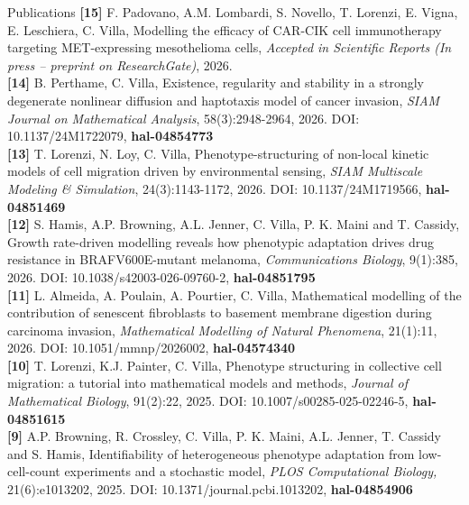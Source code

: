 \documentclass{resume} %
\begin{document}
\newpage
%
\begin{rSection}{Publications}
{\bf [15]} F. Padovano, A.M. Lombardi, S. Novello, T. Lorenzi, E. Vigna, E. Leschiera, C. Villa, Modelling the efficacy of CAR-CIK cell immunotherapy targeting MET-expressing mesothelioma cells, \textit{Accepted in Scientific Reports (In press -- preprint on ResearchGate)}, 2026.\\
{\bf [14]} B. Perthame, C. Villa,  Existence, regularity and stability in a strongly degenerate nonlinear diffusion and haptotaxis model of cancer invasion, \textit{SIAM Journal on Mathematical Analysis}, 58(3):2948-2964, 2026. DOI: 10.1137/24M1722079, 
\textbf{hal-04854773}\\
{\bf [13]} T. Lorenzi, N. Loy, C. Villa,  Phenotype-structuring of non-local kinetic models of cell migration driven by environmental sensing, \textit{SIAM Multiscale Modeling \& Simulation}, 24(3):1143-1172, 2026. DOI: 10.1137/24M1719566, %
\textbf{hal-04851469}\\
{\bf [12]} S. Hamis, A.P. Browning, A.L. Jenner, C. Villa, P. K. Maini and T. Cassidy, Growth rate-driven modelling reveals how phenotypic adaptation drives drug resistance in BRAFV600E-mutant melanoma, \textit{Communications Biology}, 9(1):385, 2026. DOI: 10.1038/s42003-026-09760-2, 
 \textbf{hal-04851795} \\
{\bf [11]} L. Almeida, A. Poulain, A. Pourtier, C. Villa,  Mathematical modelling of the contribution of senescent fibroblasts to basement membrane digestion during carcinoma invasion, \textit{Mathematical Modelling of Natural Phenomena}, 21(1):11, 2026. DOI: 10.1051/mmnp/2026002, \textbf{hal-04574340} \\%
{\bf [10]} T. Lorenzi, K.J. Painter, C. Villa,  Phenotype structuring in collective cell migration: a tutorial into mathematical models and methods, \textit{Journal of Mathematical Biology}, 91(2):22, 2025.  DOI: 10.1007/s00285-025-02246-5, \textbf{hal-04851615}\\
{\bf [9]} A.P. Browning, R. Crossley, C. Villa, P. K. Maini, A.L. Jenner, T. Cassidy and S. Hamis, Identifiability of heterogeneous phenotype adaptation from low-cell-count experiments and a stochastic model, \textit{PLOS Computational Biology,} 21(6):e1013202, 2025.  DOI: 10.1371/journal.pcbi.1013202, \textbf{hal-04854906} \\

\end{rSection}
\end{document}
